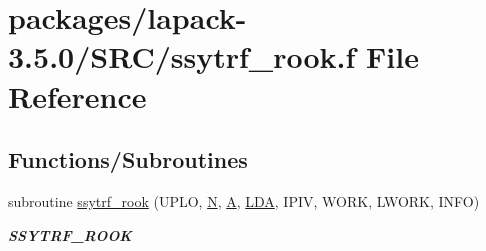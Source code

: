 \hypertarget{ssytrf__rook_8f}{}\section{packages/lapack-\/3.5.0/\+S\+R\+C/ssytrf\+\_\+rook.f File Reference}
\label{ssytrf__rook_8f}
\subsection*{Functions/\+Subroutines}
\begin{DoxyCompactItemize}
\item 
subroutine \hyperlink{group__realSYcomputational_ga3ee23af3bb6160578d858a59b053f007}{ssytrf\+\_\+rook} (U\+P\+L\+O, \hyperlink{polmisc_8c_a0240ac851181b84ac374872dc5434ee4}{N}, \hyperlink{classA}{A}, \hyperlink{example__user_8c_ae946da542ce0db94dced19b2ecefd1aa}{L\+D\+A}, I\+P\+I\+V, W\+O\+R\+K, L\+W\+O\+R\+K, I\+N\+F\+O)
\begin{DoxyCompactList}\small\item\em {\bfseries S\+S\+Y\+T\+R\+F\+\_\+\+R\+O\+O\+K} \end{DoxyCompactList}\end{DoxyCompactItemize}
